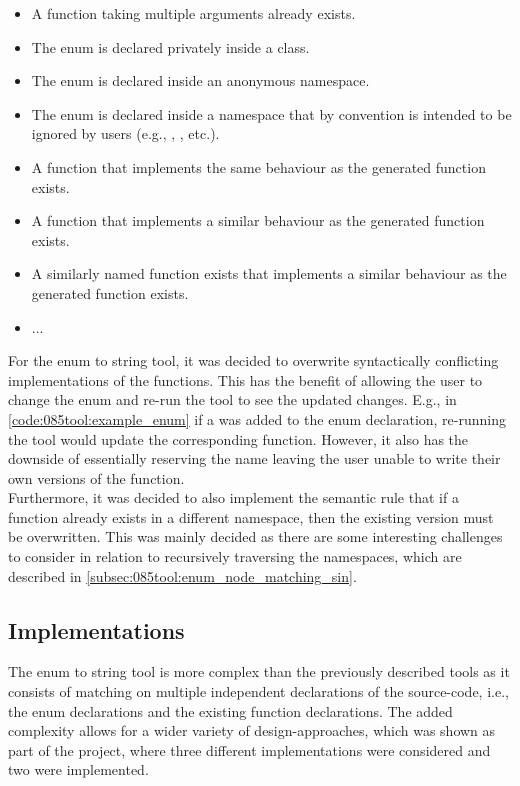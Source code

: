 \begin{itemize}
    \vspace{-0.75em}
    \item A  function taking multiple arguments already exists.
    \item The enum is declared privately inside a class.
    \item The enum is declared inside an anonymous namespace.
    \item The enum is declared inside a namespace that by convention is intended to be ignored by users (e.g., , , etc.).
    \item A function that implements the same behaviour as the generated  function exists.
    \item A function that implements a similar behaviour as the generated  function exists.
    \item A similarly named function exists that implements a similar behaviour as the generated  function exists.
    \item ...
\end{itemize}

For the enum to string tool, it was decided to overwrite syntactically conflicting implementations of the  functions.
This has the benefit of allowing the user to change the enum and re-run the tool to see the updated changes. E.g., in \cref{code:085tool:example_enum} if a  was added to the enum declaration, re-running the tool would update the corresponding  function.
However, it also has the downside of essentially reserving the  name leaving the user unable to write their own versions of the function.\\
Furthermore, it was decided to also implement the semantic rule that if a  function already exists in a different namespace, then the existing version must be overwritten. This was mainly decided as there are some interesting challenges to consider in relation to recursively traversing the namespaces, which are described in \cref{subsec:085tool:enum_node_matching_sin}.

\subsection{Implementations}
The enum to string tool is more complex than the previously described tools as it consists of matching on multiple independent declarations of the source-code, i.e., the enum declarations and the existing  function declarations. The added complexity allows for a wider variety of design-approaches, which was shown as part of the project, where three different implementations were considered and two were implemented.

